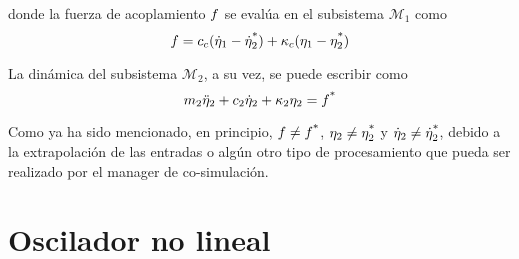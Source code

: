 donde la fuerza de acoplamiento $f$ se evalúa en el subsistema $\mathcal{M}_1$ como
%
\begin{equation}
	f = c_c (\dot{\eta}_1 - \dot{\eta}_2^{\textrm *}) + \kappa_c (\eta_1 - \eta_2^{\textrm *})
\end{equation}

La dinámica del subsistema $\mathcal{M}_2$, a su vez, se puede escribir como
%
\begin{equation}
    m_2 \ddot{\eta}_2 + c_2 \dot{\eta}_2 + \kappa_2 \eta_2 = f^{\textrm *}
\end{equation}

Como ya ha sido mencionado, en principio, $f \neq f^{\textrm *}$, $\eta_2 \neq \eta_2^{\textrm *}$ y $\dot{\eta}_2 \neq \dot{\eta}_2^{\textrm *}$, debido a la extrapolación de las entradas o algún otro tipo de procesamiento que pueda ser realizado por el manager de co-simulación.

\section{Oscilador no lineal}
\label{sec:osciladorNL}

